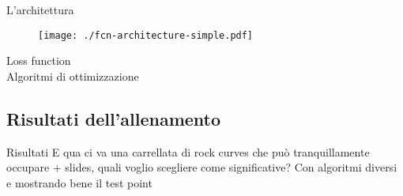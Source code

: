 \documentclass{beamer}
\begin{document}
\begin{frame}{L'architettura}
  \begin{figure}
    \texttt{[image: ./fcn-architecture-simple.pdf]}
  \end{figure}

%
%
\end{frame}

\begin{frame}{Loss function \\Algoritmi di ottimizzazione}
  \begin{figure}
    \centering
  \end{figure}
%
%
%

\end{frame}

\subsection{Risultati dell'allenamento}
\begin{frame}{Risultati}
  E qua ci va una carrellata di rock curves che può tranquillamente occupare $+$ slides, quali voglio scegliere come significative? Con algoritmi diversi e mostrando bene il test point

\end{frame}
\end{document}
